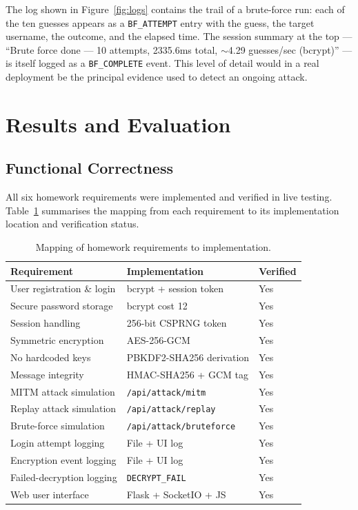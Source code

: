 \documentclass[conference]{IEEEtran}
\begin{document}
The log shown in Figure~\ref{fig:logs} contains the trail of a brute-force run: each of the ten guesses appears as a \texttt{BF\_ATTEMPT} entry with the guess, the target username, the outcome, and the elapsed time. The session summary at the top --- ``Brute force done --- 10 attempts, 2335.6ms total, $\sim$4.29 guesses/sec (bcrypt)'' --- is itself logged as a \texttt{BF\_COMPLETE} event. This level of detail would in a real deployment be the principal evidence used to detect an ongoing attack.

\section{Results and Evaluation}
\label{sec:results}

\subsection{Functional Correctness}
All six homework requirements were implemented and verified in live testing. Table~\ref{tab:checklist} summarises the mapping from each requirement to its implementation location and verification status.

\begin{table}[H]
\centering
\caption{Mapping of homework requirements to implementation.}
\renewcommand{\arraystretch}{1.15}
\begin{tabular}{p{}p{}p{}}
\toprule
\textbf{Requirement} & \textbf{Implementation} & \textbf{Verified} \\
\midrule
User registration \& login    & bcrypt + session token    & Yes \\
Secure password storage       & bcrypt cost 12            & Yes \\
Session handling              & 256-bit CSPRNG token      & Yes \\
Symmetric encryption          & AES-256-GCM               & Yes \\
No hardcoded keys             & PBKDF2-SHA256 derivation  & Yes \\
Message integrity             & HMAC-SHA256 + GCM tag     & Yes \\
MITM attack simulation        & \texttt{/api/attack/mitm} & Yes \\
Replay attack simulation      & \texttt{/api/attack/replay} & Yes \\
Brute-force simulation        & \texttt{/api/attack/bruteforce} & Yes \\
Login attempt logging         & File + UI log             & Yes \\
Encryption event logging      & File + UI log             & Yes \\
Failed-decryption logging     & \texttt{DECRYPT\_FAIL}    & Yes \\
Web user interface            & Flask + SocketIO + JS     & Yes \\
\bottomrule
\end{tabular}
\label{tab:checklist}
\end{table}
\end{document}
